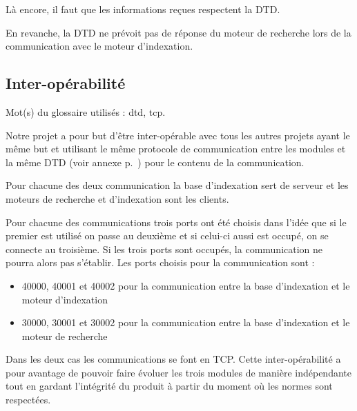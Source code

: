 \documentclass[a4paper,12pt]{report}
\begin{document}
Là encore, il faut que les informations reçues respectent la DTD.

En revanche, la DTD ne prévoit pas de réponse du moteur de recherche lors de la communication avec le moteur d'indexation.

\subsection{Inter-opérabilité}\label{inter_operabilite}
Mot(s) du glossaire utilisés : \gls{dtd}, \gls{tcp}.

Notre projet a pour but d'être inter-opérable avec tous les autres projets ayant le même but et utilisant le même protocole de communication entre les modules et la même DTD (voir annexe p.~\pageref{dtd}) pour le contenu de la communication.

Pour chacune des deux communication la base d'indexation sert de serveur et les moteurs de recherche et d'indexation sont les clients.

Pour chacune des communications trois ports ont été choisis dans l'idée que si le premier est utilisé on passe au deuxième et si celui-ci aussi est occupé, on se connecte au troisième. Si les trois ports sont occupés, la communication ne pourra alors pas s'établir. Les ports choisis pour la communication sont :
\begin{itemize}
\item 40000, 40001 et 40002 pour la communication entre la base d'indexation et le moteur d'indexation
\item 30000, 30001 et 30002 pour la communication entre la base d'indexation et le moteur de recherche
\end{itemize}
Dans les deux cas les communications se font en TCP.
Cette inter-opérabilité a pour avantage de pouvoir faire évoluer les trois modules de manière indépendante tout en gardant l'intégrité du produit à partir du moment où les normes sont respectées.
\end{document}
